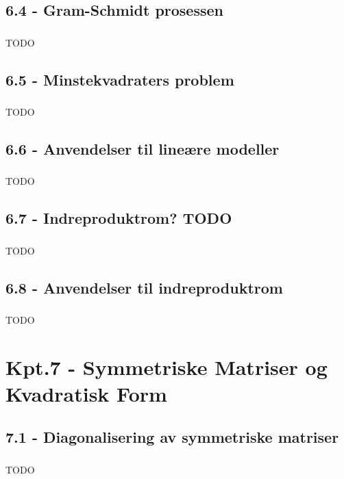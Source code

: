 \documentclass{article}
\begin{document}
    \subsection{6.4 - Gram-Schmidt prosessen}
      \subsubsection{}
        TODO
    \subsection{6.5 - Minstekvadraters problem}
      \subsubsection{}
        TODO
    \subsection{6.6 - Anvendelser til lineære modeller}
      \subsubsection{}
        TODO
    \subsection{6.7 - Indreproduktrom? TODO}
      \subsubsection{}
        TODO
    \subsection{6.8 - Anvendelser til indreproduktrom}
      \subsubsection{}
        TODO
  \section{Kpt.7 - Symmetriske Matriser og Kvadratisk Form}
    \subsection{7.1 - Diagonalisering av symmetriske matriser}
      \subsubsection{}
        TODO
\end{document}
